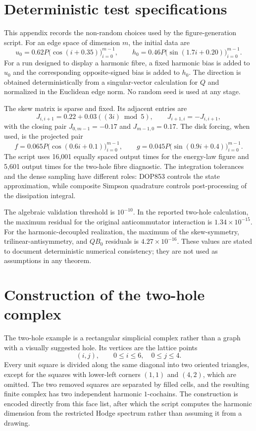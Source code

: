 \documentclass[11pt]{article}
\theoremstyle{remark}
\begin{document}
\section{Deterministic test specifications}

This appendix records the non-random choices used by the figure-generation script. For an edge space of dimension $m$, the initial data are
\[
u_0=0.62P\bigl(\cos(i+0.35)\bigr)_{i=0}^{m-1},
\qquad
h_0=0.46P\bigl(\sin(1.7i+0.20)\bigr)_{i=0}^{m-1}.
\]
For a run designed to display a harmonic fibre, a fixed harmonic bias is added to $u_0$ and the corresponding opposite-signed bias is added to $h_0$. The direction is obtained deterministically from a singular-vector calculation for $Q$ and normalized in the Euclidean edge norm. No random seed is used at any stage.

The skew matrix is sparse and fixed. Its adjacent entries are
\[
J_{i,i+1}=0.22+0.03((3i)\bmod5),
\qquad
J_{i+1,i}=-J_{i,i+1},
\]
with the closing pair $J_{0,m-1}=-0.17$ and $J_{m-1,0}=0.17$. The disk forcing, when used, is the projected pair
\[
f=0.065P\bigl(\cos(0.6i+0.1)\bigr)_{i=0}^{m-1},
\qquad
g=0.045P\bigl(\sin(0.9i+0.4)\bigr)_{i=0}^{m-1}.
\]
The script uses 16,001 equally spaced output times for the energy-law figure and 5,601 output times for the two-hole fibre diagnostic. The integration tolerances and the dense sampling have different roles: DOP853 controls the state approximation, while composite Simpson quadrature controls post-processing of the dissipation integral.

The algebraic validation threshold is $10^{-10}$. In the reported two-hole calculation, the maximum residual for the original anticommutator interaction is $1.34\times10^{-15}$. For the harmonic-decoupled realization, the maximum of the skew-symmetry, trilinear-antisymmetry, and $QB_0$ residuals is $4.27\times10^{-16}$. These values are stated to document deterministic numerical consistency; they are not used as assumptions in any theorem.

\section{Construction of the two-hole complex}

The two-hole example is a rectangular simplicial complex rather than a graph with a visually suggested hole. Its vertices are the lattice points
\[
(i,j),\qquad 0\leq i\leq6,\quad 0\leq j\leq4.
\]
Every unit square is divided along the same diagonal into two oriented triangles, except for the squares with lower-left corners $(1,1)$ and $(4,2)$, which are omitted. The two removed squares are separated by filled cells, and the resulting finite complex has two independent harmonic $1$-cochains. The construction is encoded directly from this face list, after which the script computes the harmonic dimension from the restricted Hodge spectrum rather than assuming it from a drawing.
\end{document}
